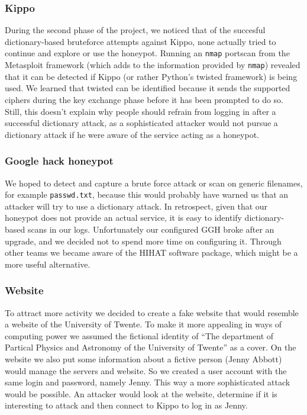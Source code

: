 \documentclass[11pt]{article}
\begin{document}
\subsubsection{Kippo}
During the second phase of the project, we noticed that of the succesful dictionary-based bruteforce attempts against Kippo, none actually tried to continue and explore or use the honeypot.
Running an \verb|nmap| portscan from the Metasploit framework (which adds to the information provided by \verb|nmap|) revealed that it can be detected if Kippo (or rather Python's twisted framework) is being used.
We learned that twisted can be identified because it sends the supported ciphers during the key exchange phase before it has been prompted to do so.
Still, this doesn't explain why people should refrain from logging in after a successful dictionary attack, as a sophisticated attacker would not pursue a dictionary attack if he were aware of the service acting as a honeypot.


\subsubsection{Google hack honeypot}
We hoped to detect and capture a brute force attack or scan on generic filenames, for example \verb|passwd.txt|, because this would probably have warned us that an attacker will try to use a dictionary attack.
In retrospect, given that our honeypot does not provide an actual service, it is easy to identify dictionary-based scans in our logs.
Unfortunately our configured GGH broke after an upgrade, and we decided not to spend more time on configuring it.
Through other teams we became aware of the HIHAT software package, which might be a more useful alternative.

\subsubsection{Website}
To attract more activity we decided to create a fake website that would resemble a website of the University of Twente. To make it more appealing in ways of computing power we assumed the fictional identity of ``The department of Partical Physics and Astronomy of the University of Twente'' as a cover.
On the website we also put some information about a fictive person (Jenny Abbott) would manage the servers and website. So we created a user account with the same login and password, namely Jenny. This way a more sophisticated attack would be possible. An attacker would look at the website, determine if it is interesting to attack and then connect to Kippo to log in as Jenny.
\end{document}
